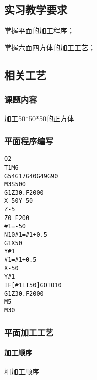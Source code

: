 \jxhj{%
	}

\makeshouye %

\subsection{实习教学要求}
\begin{compactenum}[\hspace{2em}1、]
	\item 掌握平面的加工程序；
	\item 掌握六面四方体的加工工艺；
\end{compactenum}

\subsection{相关工艺}
\subsubsection{课题内容}
加工50*50*50的正方体
\subsubsection{平面程序编写}

\begin{lstlisting}
O2
T1M6
G54G17G40G49G90
M3S500
G1Z30.F2000
X-50Y-50
Z-5
Z0 F200
#1=-50
N10#1=#1+0.5
G1X50
Y#1
#1=#1+0.5
X-50
Y#1
IF[#1LT50]GOTO10
G1Z30.F2000
M5
M30
\end{lstlisting}



\subsubsection{平面加工工艺}
\paragraph{加工顺序}
粗加工顺序

